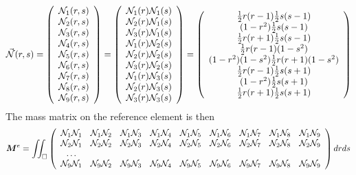 \[
\vec{\bN}(r,s) 
=
\left(
\begin{array}{c}
\bN_1(r,s) \\ 
\bN_2(r,s) \\
\bN_3(r,s) \\
\bN_4(r,s) \\
\bN_5(r,s) \\
\bN_6(r,s) \\
\bN_7(r,s) \\
\bN_8(r,s) \\
\bN_9(r,s) 
\end{array}
\right)
=
\left(
\begin{array}{c}
\bN_1(r) \bN_1(s) \\
\bN_2(r) \bN_1(s) \\
\bN_3(r) \bN_1(s) \\
\bN_1(r) \bN_2(s) \\
\bN_2(r) \bN_2(s) \\
\bN_3(r) \bN_2(s) \\
\bN_1(r) \bN_3(s) \\
\bN_2(r) \bN_3(s) \\
\bN_3(r) \bN_3(s) 
\end{array}
\right)
=
\left(
\begin{array}{c}
 \frac{1}{2}r(r-1)  \frac{1}{2}s(s-1)\\
     (1-r^2)        \frac{1}{2}s(s-1)\\
 \frac{1}{2}r(r+1)  \frac{1}{2}s(s-1)\\
 \frac{1}{2}r(r-1)  (1-s^2)\\
     (1-r^2)        (1-s^2)
 \frac{1}{2}r(r+1)  (1-s^2)\\
 \frac{1}{2}r(r-1)  \frac{1}{2}s(s+1)\\
     (1-r^2)        \frac{1}{2}s(s+1)\\
 \frac{1}{2}r(r+1)  \frac{1}{2}s(s+1)\\
\end{array}
\right)
\]
The mass matrix on the reference element is then
\[
{\bm M}^e =
\iint_\square
\left(
\begin{array}{ccccccccc}
\bN_1 \bN_1 & \bN_1 \bN_2 & \bN_1 \bN_3 & \bN_1 \bN_4 & \bN_1 \bN_5 & \bN_1 \bN_6 & \bN_1 \bN_7 & \bN_1 \bN_8 & \bN_1 \bN_9 \\ 
\bN_2 \bN_1 & \bN_2 \bN_2 & \bN_2 \bN_3 & \bN_2 \bN_4 & \bN_2 \bN_5 & \bN_2 \bN_6 & \bN_2 \bN_7 & \bN_2 \bN_8 & \bN_2 \bN_9 \\ 
\dots \\
\bN_9 \bN_1 & \bN_9 \bN_2 & \bN_9 \bN_3 & \bN_9 \bN_4 & \bN_9 \bN_5 & \bN_9 \bN_6 & \bN_9 \bN_7 & \bN_9 \bN_8 & \bN_9 \bN_9 
\end{array}
\right)
dr ds
\]
